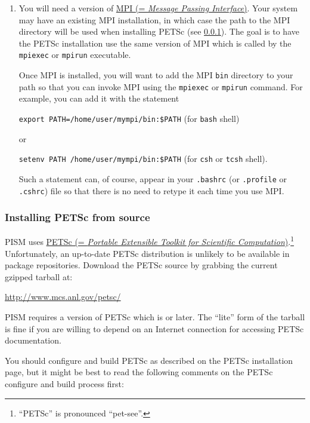 \documentclass[titlepage,letterpaper,final]{scrartcl}
\begin{document}
\begin{enumerate}
\item You will need a version of \href{http://www.mcs.anl.gov/mpi/}{MPI (=
    \emph{Message Passing Interface})}. Your system may have an existing MPI installation, in which
  case the path to the MPI directory will be used when installing PETSc  (see \ref{subsec:prereq-petsc}).
  The goal is to have the PETSc installation use the
  same version of MPI which is called by the \texttt{mpiexec} or \texttt{mpirun}
  executable.

  Once MPI is installed, you will
  want to add the MPI \texttt{bin} directory to your path so that you can
  invoke MPI using the \texttt{mpiexec} or \texttt{mpirun} command. For
  example, you can add it with the statement

\texttt{export PATH=/home/user/mympi/bin:\$PATH}  \qquad (for \texttt{bash} shell)

\noindent or

\texttt{setenv PATH /home/user/mympi/bin:\$PATH}  \qquad (for \texttt{csh} or \texttt{tcsh} shell).

\noindent Such a statement can, of course, appear in your \texttt{.bashrc} (or
\texttt{.profile} or \texttt{.cshrc}) file so that there is no need to retype
it each time you use MPI.

\end{enumerate}


\subsubsection{Installing PETSc from source}
\label{subsec:prereq-petsc}
  
PISM uses \href{http://www.mcs.anl.gov/petsc/}{PETSc (=
    \emph{Portable Extensible Toolkit for Scientific
      Computation})}.\footnote{``PETSc''
  is pronounced ``pet-see''.}  Unfortunately, an up-to-date PETSc distribution
  is unlikely to be available in package repositories.  Download the PETSc
  source by grabbing the current gzipped tarball at:
\begin{center}
    \url{http://www.mcs.anl.gov/petsc/}
\end{center}
PISM requires a version of PETSc which is \texttt{\PETSCREL} or later. The
``lite'' form of the tarball is fine if you are willing to depend on an Internet
connection for accessing PETSc documentation.

You should configure and build PETSc as described on the
PETSc installation page, but it might be best to read the following comments on
the PETSc configure and build process first:
\end{document}
